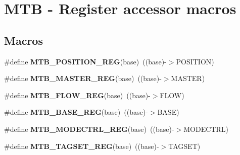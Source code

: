 \hypertarget{group___m_t_b___register___accessor___macros}{}\section{M\+TB -\/ Register accessor macros}
\label{group___m_t_b___register___accessor___macros}
\subsection*{Macros}
\begin{DoxyCompactItemize}
\item 
\mbox{\label{group___m_t_b___register___accessor___macros_gab09a5c0d30a1ff9148269b45679f0a96}} 
\#define {\bfseries M\+T\+B\+\_\+\+P\+O\+S\+I\+T\+I\+O\+N\+\_\+\+R\+EG}(base)~((base)-\/$>$P\+O\+S\+I\+T\+I\+ON)
\item 
\mbox{\label{group___m_t_b___register___accessor___macros_ga142ef5fc493afaf8160fe03488ff03a1}} 
\#define {\bfseries M\+T\+B\+\_\+\+M\+A\+S\+T\+E\+R\+\_\+\+R\+EG}(base)~((base)-\/$>$M\+A\+S\+T\+ER)
\item 
\mbox{\label{group___m_t_b___register___accessor___macros_ga15b22e1ac15074a886967200ba55cb1f}} 
\#define {\bfseries M\+T\+B\+\_\+\+F\+L\+O\+W\+\_\+\+R\+EG}(base)~((base)-\/$>$F\+L\+OW)
\item 
\mbox{\label{group___m_t_b___register___accessor___macros_gad5de83ac068d2c0100cf3d14c351a24a}} 
\#define {\bfseries M\+T\+B\+\_\+\+B\+A\+S\+E\+\_\+\+R\+EG}(base)~((base)-\/$>$B\+A\+SE)
\item 
\mbox{\label{group___m_t_b___register___accessor___macros_ga6e6ab43aedd8d0a4ecd61b673f3dcfef}} 
\#define {\bfseries M\+T\+B\+\_\+\+M\+O\+D\+E\+C\+T\+R\+L\+\_\+\+R\+EG}(base)~((base)-\/$>$M\+O\+D\+E\+C\+T\+RL)
\item 
\mbox{\label{group___m_t_b___register___accessor___macros_gabc0322acf08b1bcadb2cf2ec6f636dda}} 
\#define {\bfseries M\+T\+B\+\_\+\+T\+A\+G\+S\+E\+T\+\_\+\+R\+EG}(base)~((base)-\/$>$T\+A\+G\+S\+ET)

\end{DoxyCompactItemize}
